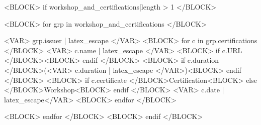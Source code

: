 <BLOCK> if workshop_and_certifications|length > 1 </BLOCK>




<BLOCK> for grp in workshop_and_certifications </BLOCK>
\begin{issuerhonors}{<VAR> grp.issuer | latex_escape </VAR>}
  \newline
  <BLOCK> for c in grp.certifications </BLOCK>
  \cvhonor
    {%
      <VAR> c.name | latex_escape </VAR>%
      <BLOCK> if c.URL </BLOCK>\enskip\href{<VAR> c.URL </VAR>}{\honorlocationstyle{[LINK]}}<BLOCK> endif </BLOCK>%
    }
    {<BLOCK> if c.duration </BLOCK>(<VAR> c.duration | latex_escape </VAR>)<BLOCK> endif </BLOCK>}
    {<BLOCK> if c.certificate </BLOCK>Certification<BLOCK> else </BLOCK>Workshop<BLOCK> endif </BLOCK>}
    {<VAR> c.date | latex_escape</VAR>}
  <BLOCK> endfor </BLOCK>
\end{issuerhonors}
\newline
<BLOCK> endfor </BLOCK>
<BLOCK> endif </BLOCK>
